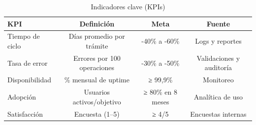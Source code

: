 \begin{table}[htbp]
\centering
\caption{Indicadores clave (KPIs)}
\label{tab:kpis}
\begin{tabular}{lccc}
\toprule
\textbf{KPI} & \textbf{Definición} & \textbf{Meta} & \textbf{Fuente} \\
\midrule
Tiempo de ciclo & Días promedio por trámite & -40\% a -60\% & Logs y reportes \\
Tasa de error & Errores por 100 operaciones & -30\% a -50\% & Validaciones y auditoría \\
Disponibilidad & \% mensual de uptime & ≥ 99,9\% & Monitoreo \\
Adopción & Usuarios activos/objetivo & ≥ 80\% en 8 meses & Analítica de uso \\
Satisfacción & Encuesta (1–5) & ≥ 4/5 & Encuestas internas \\
\bottomrule
\end{tabular}
\end{table}